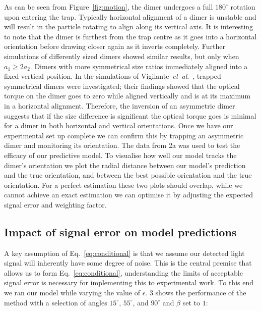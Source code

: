 \documentclass[final, 3p]{elsarticle}
\begin{document}
As can be seen from Figure~\ref{fig:motion}, the dimer undergoes a
full $180^{\circ}$ rotation upon entering the trap.  Typically
horizontal alignment of a dimer is unstable and will result in the
particle rotating to align along its vertical axis.  It is interesting
to note that the dimer is furthest from the trap centre as it goes
into a horizontal orientation before drawing closer again as it
inverts completely. Further simulations of differently sized dimers
showed similar results, but only when $a_1 \geq 2a_2$.  Dimers with
more symmetrical size ratios immediately aligned into a fixed vertical
position.
%
In the simulations of Vigilante~\emph{et~al}.\
\cite{Vigilante2020Brownian_OT}, trapped symmetrical dimers were
investigated; their findings showed that the optical torque on the
dimer goes to zero while aligned vertically and is at its maximum in a
horizontal alignment.  Therefore, the inversion of an asymmetric dimer
suggests that if the size difference is significant the optical torque
goes is minimal for a dimer in both horizontal and vertical
orientations. Once we have our experimental set up complete we can
confirm this by trapping an asymmetric dimer and monitoring its
orientation.  The data from \figurename{ 2a} was used to test the
efficacy of our predictive model.  To visualise how well our model
tracks the dimer's orientation we plot the radial distance between our
model's prediction and the true orientation, and between the best
possible orientation and the true orientation.  For a perfect
estimation these two plots should overlap, while we cannot achieve an
exact estimation we can optimise it by adjusting the expected signal
error and weighting factor.


\subsection{Impact of signal error on model predictions}
\label{sec:epsilon}

A key assumption of Eq.~\eqref{eq:conditional} is that we assume our
detected light signal will inherently have some degree of noise. This
is the central premise that allows us to form
Eq.~\eqref{eq:conditional}, understanding the limits of acceptable
signal error is necessary for implementing this to experimental work.
To this end we ran our model while varying the value of $\epsilon$.
\figurename{ 3} shows the performance of the method with a selection
of angles $15^{\circ}$, $55^{\circ}$, and $90^{\circ}$ and $\beta$ set
to $1$:
\end{document}
